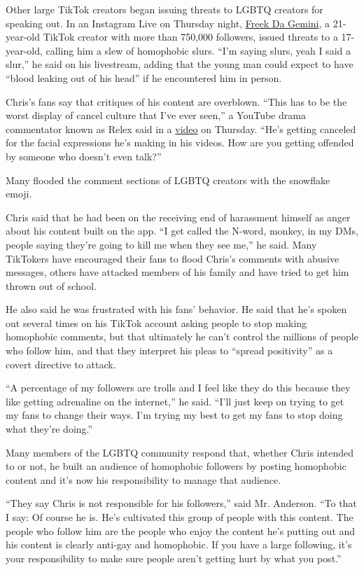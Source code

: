 Other large TikTok creators began issuing threats to LGBTQ creators for
speaking out. In an Instagram Live on Thursday night,
\href{https://www.tiktok.com/@freekdagemini?lang=en}{Freek Da Gemini}, a
21-year-old TikTok creator with more than 750,000 followers, issued
threats to a 17-year-old, calling him a slew of homophobic slurs. ``I'm
saying slurs, yeah I said a slur,'' he said on his livestream, adding
that the young man could expect to have ``blood leaking out of his
head'' if he encountered him in person.

Chris's fans say that critiques of his content are overblown. ``This has
to be the worst display of cancel culture that I've ever seen,'' a
YouTube drama commentator known as Relex said in a
\href{https://www.youtube.com/watch?v=T3s0uaOfpPo\&feature=youtu.be}{video}
on Thursday. ``He's getting canceled for the facial expressions he's
making in his videos. How are you getting offended by someone who
doesn't even talk?''

Many flooded the comment sections of LGBTQ creators with the snowflake
emoji.

Chris said that he had been on the receiving end of harassment himself
as anger about his content built on the app. ``I get called the N-word,
monkey, in my DMs, people saying they're going to kill me when they see
me,'' he said. Many TikTokers have encouraged their fans to flood
Chris's comments with abusive messages, others have attacked members of
his family and have tried to get him thrown out of school.

He also said he was frustrated with his fans' behavior. He said that
he's spoken out several times on his TikTok account asking people to
stop making homophobic comments, but that ultimately he can't control
the millions of people who follow him, and that they interpret his pleas
to ``spread positivity'' as a covert directive to attack.

``A percentage of my followers are trolls and I feel like they do this
because they like getting adrenaline on the internet,'' he said. ``I'll
just keep on trying to get my fans to change their ways. I'm trying my
best to get my fans to stop doing what they're doing.''

Many members of the LGBTQ community respond that, whether Chris intended
to or not, he built an audience of homophobic followers by posting
homophobic content and it's now his responsibility to manage that
audience.

``They say Chris is not responsible for his followers,'' said Mr.
Anderson. ``To that I say: Of course he is. He's cultivated this group
of people with this content. The people who follow him are the people
who enjoy the content he's putting out and his content is clearly
anti-gay and homophobic. If you have a large following, it's your
responsibility to make sure people aren't getting hurt by what you
post.''


